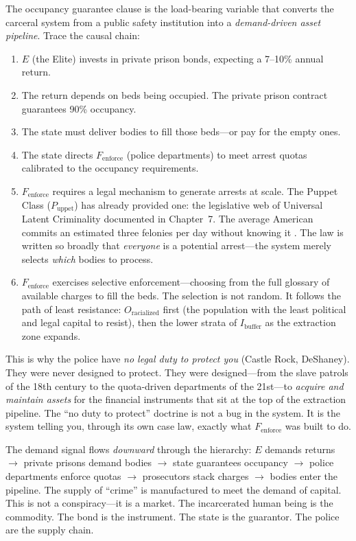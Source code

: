 \documentclass[12pt,openany]{book}
\begin{document}
The occupancy guarantee clause is the load-bearing variable that converts the carceral system from a public safety institution into a \textit{demand-driven asset pipeline}. Trace the causal chain:

\begin{enumerate}
    \item $E$ (the Elite) invests in private prison bonds, expecting a 7--10\% annual return.
    \item The return depends on beds being occupied. The private prison contract guarantees 90\% occupancy.
    \item The state must deliver bodies to fill those beds---or pay for the empty ones.
    \item The state directs $F_{\text{enforce}}$ (police departments) to meet arrest quotas calibrated to the occupancy requirements.
    \item $F_{\text{enforce}}$ requires a legal mechanism to generate arrests at scale. The Puppet Class ($P_{\text{uppet}}$) has already provided one: the legislative web of Universal Latent Criminality documented in Chapter~7. The average American commits an estimated three felonies per day without knowing it \cite{silverglate}. The law is written so broadly that \textit{everyone} is a potential arrest---the system merely selects \textit{which} bodies to process.
    \item $F_{\text{enforce}}$ exercises selective enforcement---choosing from the full glossary of available charges to fill the beds. The selection is not random. It follows the path of least resistance: $O_{\text{racialized}}$ first (the population with the least political and legal capital to resist), then the lower strata of $I_{\text{buffer}}$ as the extraction zone expands.
\end{enumerate}

This is why the police have \textit{no legal duty to protect you} (Castle Rock, DeShaney). They were never designed to protect. They were designed---from the slave patrols of the 18th century to the quota-driven departments of the 21st---to \textit{acquire and maintain assets} for the financial instruments that sit at the top of the extraction pipeline. The ``no duty to protect'' doctrine is not a bug in the system. It is the system telling you, through its own case law, exactly what $F_{\text{enforce}}$ was built to do.

The demand signal flows \textit{downward} through the hierarchy: $E$ demands returns $\rightarrow$ private prisons demand bodies $\rightarrow$ state guarantees occupancy $\rightarrow$ police departments enforce quotas $\rightarrow$ prosecutors stack charges $\rightarrow$ bodies enter the pipeline. The supply of ``crime'' is manufactured to meet the demand of capital. This is not a conspiracy---it is a market. The incarcerated human being is the commodity. The bond is the instrument. The state is the guarantor. The police are the supply chain.
\end{document}
